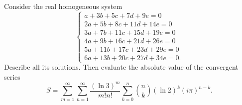 Consider the real homogeneous system
\[
\begin{cases}
a+3b+5c+7d+9e=0\\
2a+5b+8c+11d+14e=0\\
3a+7b+11c+15d+19e=0\\
4a+9b+16c+21d+26e=0\\
5a+11b+17c+23d+29e=0\\
6a+13b+20c+27d+34e=0.
\end{cases}
\]
Describe all its solutions. Then evaluate the absolute value of the convergent series
\[
S=\sum_{m=1}^{\infty}\sum_{n=1}^{\infty}
\dfrac{(\ln3)^m}{m!n!}\sum_{k=0}^{n}\binom nk(\ln2)^k(i\pi)^{n-k}.
\]
